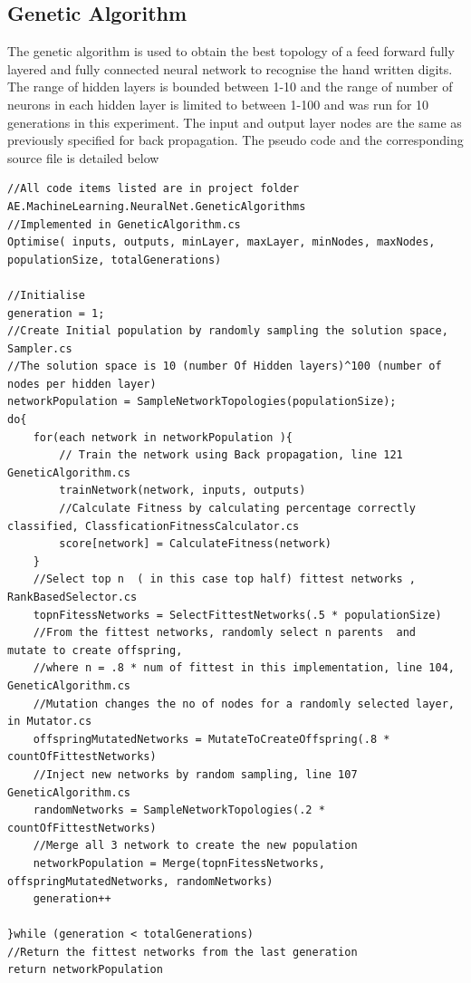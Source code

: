  \subsection{Genetic Algorithm}
The genetic algorithm is used to obtain the best topology of a feed forward fully layered and fully connected neural network to recognise the hand written digits. The range of hidden layers is bounded between 1-10 and the range of number of neurons in each hidden layer is limited to between 1-100 and was run for 10 generations in this experiment. The input and output layer nodes are the same as previously specified for back propagation. The pseudo code and the corresponding source file is detailed below
\lstset{language=java, caption=Pseudo Code: Genetic Algorithm to optimise topology, , label=code:geneticAlgorithm}
\begin{lstlisting}
//All code items listed are in project folder AE.MachineLearning.NeuralNet.GeneticAlgorithms
//Implemented in GeneticAlgorithm.cs
Optimise( inputs, outputs, minLayer, maxLayer, minNodes, maxNodes, populationSize, totalGenerations)

//Initialise
generation = 1;
//Create Initial population by randomly sampling the solution space, Sampler.cs
//The solution space is 10 (number Of Hidden layers)^100 (number of nodes per hidden layer)
networkPopulation = SampleNetworkTopologies(populationSize);	
do{
	for(each network in networkPopulation ){	
		// Train the network using Back propagation, line 121 GeneticAlgorithm.cs
		trainNetwork(network, inputs, outputs)
		//Calculate Fitness by calculating percentage correctly classified, ClassficationFitnessCalculator.cs
	 	score[network] = CalculateFitness(network)
	}	
	//Select top n  ( in this case top half) fittest networks , RankBasedSelector.cs
	topnFitessNetworks = SelectFittestNetworks(.5 * populationSize)
	//From the fittest networks, randomly select n parents  and  mutate to create offspring, 
	//where n = .8 * num of fittest in this implementation, line 104, GeneticAlgorithm.cs
	//Mutation changes the no of nodes for a randomly selected layer, in Mutator.cs
	offspringMutatedNetworks = MutateToCreateOffspring(.8 * countOfFittestNetworks)
	//Inject new networks by random sampling, line 107 GeneticAlgorithm.cs
	randomNetworks = SampleNetworkTopologies(.2 * countOfFittestNetworks)
	//Merge all 3 network to create	the new population
	networkPopulation = Merge(topnFitessNetworks, offspringMutatedNetworks, randomNetworks)
	generation++

}while (generation < totalGenerations)
//Return the fittest networks from the last generation
return networkPopulation
\end{lstlisting}
